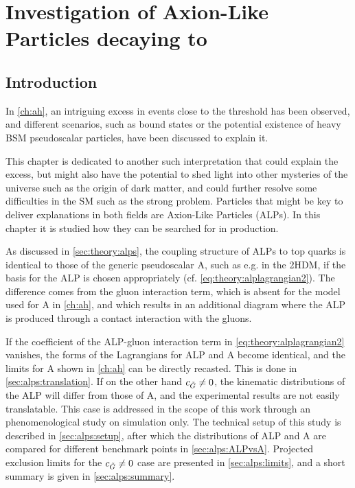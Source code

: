 \chapter{Investigation of Axion-Like Particles decaying to \ttbartitle}
\label{ch:alps}

\section{Introduction}

In \cref{ch:ah}, an intriguing excess in \ttbar events close to the \ttbar threshold has been observed, and different scenarios, such as \ttbar bound states or the potential existence of heavy BSM pseudoscalar particles, have been discussed to explain it.

This chapter is dedicated to another such interpretation that could explain the excess, but might also have the potential to shed light into other mysteries of the universe such as the origin of dark matter, and could further resolve some difficulties in the SM such as the strong \CP problem. Particles that might be key to deliver explanations in both fields are Axion-Like Particles (ALPs). In this chapter it is studied how they can be searched for in \ttbar production.

As discussed in \cref{sec:theory:alps}, the coupling structure of ALPs to top quarks is identical to those of the generic pseudoscalar A, such as e.g. in the 2HDM, if the basis for the ALP is chosen appropriately (cf. \cref{eq:theory:alplagrangian2}). The difference comes from the gluon interaction term, which is absent for the model used for A in \cref{ch:ah}, and which results in an additional diagram where the ALP is produced through a contact interaction with the gluons. 

If the coefficient \cG of the ALP-gluon interaction term in \cref{eq:theory:alplagrangian2} vanishes, the forms of the Lagrangians for ALP and A become identical, and the limits for A shown in \cref{ch:ah} can be directly recasted. This is done in \cref{sec:alps:translation}. If on the other hand $c_{\tilde{G}} \neq 0$, the kinematic distributions of the ALP will differ from those of A, and the experimental results are not easily translatable. This case is addressed in the scope of this work through an phenomenological study on simulation only. The technical setup of this study is described in \cref{sec:alps:setup}, after which the distributions of ALP and A are compared for different benchmark points in \cref{sec:alps:ALPvsA}. Projected exclusion limits for the $c_{\tilde{G}} \neq 0$ case are presented in \cref{sec:alps:limits}, and a short summary is given in \cref{sec:alps:summary}.

